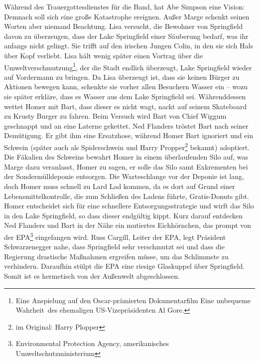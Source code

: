 \begin{appendix}
Während des Trauergottesdienstes für die Band, hat Abe Simpson eine Vision: Demnach soll sich eine große Katastrophe ereignen. Außer Marge schenkt seinen Worten aber niemand Beachtung. Lisa versucht, die Bewohner von Springfield davon zu überzeugen, dass der Lake Springfield einer Säuberung bedarf, was ihr anfangs nicht gelingt. Sie trifft auf den irischen Jungen Colin, in den sie sich Hals über Kopf verliebt. Lisa hält wenig später einen Vortrag über die Umweltverschmutzung\footnote{Eine Anspielung auf den Oscar-prämierten Dokumentarfilm \glqq Eine unbequeme Wahrheit\grqq\ des ehemaligen US-Vizepräsidenten Al Gore.}, der die Stadt endlich überzeugt, Lake Springfield wieder auf Vordermann zu bringen. Da Lisa überzeugt ist, dass sie keinen Bürger zu Aktionen bewegen kann, schenkte sie vorher allen Besuchern Wasser ein -- wozu sie später erkläre, dass es Wasser aus dem Lake Springfield sei. Währenddessen wettet Homer mit Bart, dass dieser es nicht wagt, nackt auf seinem Skateboard zu Krusty Burger zu fahren. Beim Versuch wird Bart von Chief Wiggum geschnappt und an eine Laterne gekettet. Ned Flanders tröstet Bart nach seiner Demütigung. Er gibt ihm eine Ersatzhose, während Homer Bart ignoriert und ein Schwein (später auch als Spiderschwein und Harry Propper\footnote{im Original: Harry Plopper} bekannt) adoptiert. Die Fäkalien des Schweins bewahrt Homer in einem überlaufenden Silo auf, was Marge dazu veranlasst, Homer zu sagen, er solle das Silo samt Exkrementen bei der Sondermülldeponie entsorgen. Die Warteschlange vor der Deponie ist lang, doch Homer muss schnell zu Lard Lad kommen, da es dort auf Grund einer Lebensmittelkontrolle, die zum Schließen des Ladens führte, Gratis-Donuts gibt. Homer entscheidet sich für eine schnellere Entsorgungsstrategie und wirft das Silo in den Lake Springfield, so dass dieser endgültig kippt. Kurz darauf entdecken Ned Flanders und Bart in der Nähe ein mutiertes Eichhörnchen, das prompt von der EPA\footnote{Environmental Protection Agency, amerikanisches Umweltschutzministerium} eingefangen wird. Russ Cargill, Leiter der EPA, legt Präsident Schwarzenegger nahe, dass Springfield sehr verschmutzt sei und dass die Regierung drastische Maßnahmen ergreifen müsse, um das Schlimmste zu verhindern. Daraufhin stülpt die EPA eine riesige Glaskuppel über Springfield. Somit ist es hermetisch von der Außenwelt abgeschlossen. 


\end{appendix}
